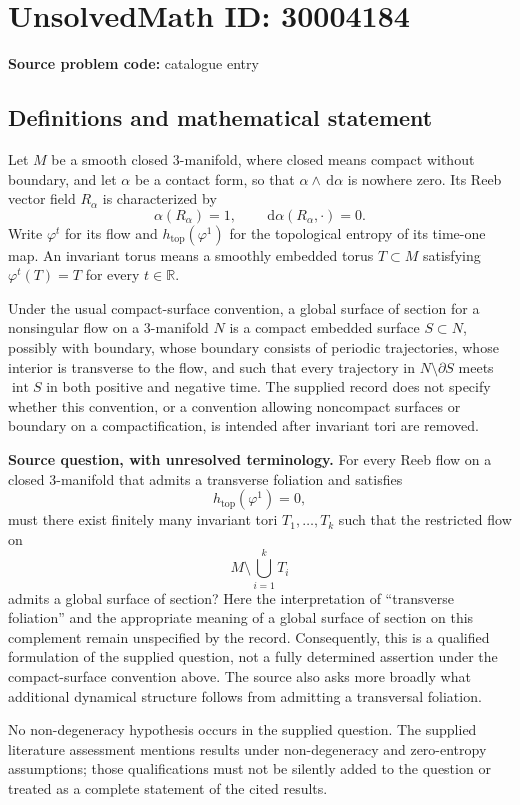 \documentclass[11pt]{article}
\newcommand{\R}{\mathbb{R}}
\newcommand{\dd}{\,\mathrm{d}}
\begin{document}
\section*{UnsolvedMath ID: 30004184}
\textbf{Source problem code:} catalogue entry
\subsection{Definitions and mathematical statement}
Let \(M\) be a smooth closed \(3\)-manifold, where closed means compact without boundary, and let \(\alpha\) be a contact form, so that \(\alpha\wedge\dd\alpha\) is nowhere zero. Its Reeb vector field \(R_\alpha\) is characterized by
\[
\alpha(R_\alpha)=1,\qquad \dd\alpha(R_\alpha,\cdot)=0.
\]
Write \(\varphi^t\) for its flow and \(h_{\mathrm{top}}(\varphi^1)\) for the topological entropy of its time-one map. An invariant torus means a smoothly embedded torus \(T\subset M\) satisfying \(\varphi^t(T)=T\) for every \(t\in\R\).

Under the usual compact-surface convention, a global surface of section for a nonsingular flow on a \(3\)-manifold \(N\) is a compact embedded surface \(S\subset N\), possibly with boundary, whose boundary consists of periodic trajectories, whose interior is transverse to the flow, and such that every trajectory in \(N\setminus\partial S\) meets \(\operatorname{int}S\) in both positive and negative time. The supplied record does not specify whether this convention, or a convention allowing noncompact surfaces or boundary on a compactification, is intended after invariant tori are removed.

\textbf{Source question, with unresolved terminology.} For every Reeb flow on a closed \(3\)-manifold that admits a transverse foliation and satisfies
\[
h_{\mathrm{top}}(\varphi^1)=0,
\]
must there exist finitely many invariant tori \(T_1,\ldots,T_k\) such that the restricted flow on
\[
M\setminus\bigcup_{i=1}^{k}T_i
\]
admits a global surface of section? Here the interpretation of ``transverse foliation'' and the appropriate meaning of a global surface of section on this complement remain unspecified by the record. Consequently, this is a qualified formulation of the supplied question, not a fully determined assertion under the compact-surface convention above. The source also asks more broadly what additional dynamical structure follows from admitting a transversal foliation.

No non-degeneracy hypothesis occurs in the supplied question. The supplied literature assessment mentions results under non-degeneracy and zero-entropy assumptions; those qualifications must not be silently added to the question or treated as a complete statement of the cited results.
\end{document}
